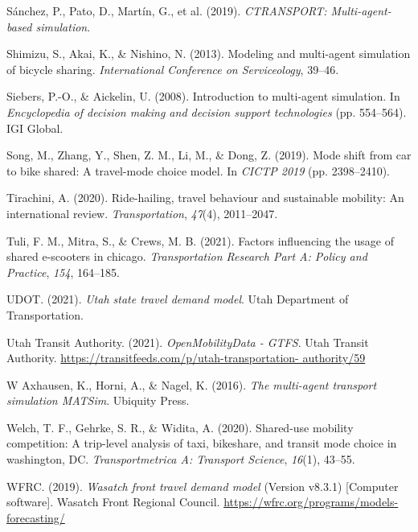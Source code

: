 \documentclass[fancy, masters]{byuthesis}
\newlength{\cslhangindent}
\newlength{\cslentryspacingunit} %
\newenvironment{CSLReferences}[2] %
 {%
  \setlength{\parindent}{0pt}
  \ifodd #1
  \let\oldpar\par
  \def\par{\hangindent=\cslhangindent\oldpar}
  \fi
  \setlength{\parskip}{#2\cslentryspacingunit}
 }%
 {}
\begin{document}
\begin{CSLReferences}{1}{0}
\leavevmode{}%
Sánchez, P., Pato, D., Martín, G., et al. (2019). \emph{CTRANSPORT: Multi-agent-based simulation}.

\leavevmode{}%
Shimizu, S., Akai, K., \& Nishino, N. (2013). Modeling and multi-agent simulation of bicycle sharing. \emph{International Conference on Serviceology}, 39--46.

\leavevmode{}%
Siebers, P.-O., \& Aickelin, U. (2008). Introduction to multi-agent simulation. In \emph{Encyclopedia of decision making and decision support technologies} (pp. 554--564). IGI Global.

\leavevmode{}%
Song, M., Zhang, Y., Shen, Z. M., Li, M., \& Dong, Z. (2019). Mode shift from car to bike shared: A travel-mode choice model. In \emph{CICTP 2019} (pp. 2398--2410).

\leavevmode{}%
Tirachini, A. (2020). Ride-hailing, travel behaviour and sustainable mobility: An international review. \emph{Transportation}, \emph{47}(4), 2011--2047.

\leavevmode{}%
Tuli, F. M., Mitra, S., \& Crews, M. B. (2021). Factors influencing the usage of shared e-scooters in chicago. \emph{Transportation Research Part A: Policy and Practice}, \emph{154}, 164--185.

\leavevmode{}%
UDOT. (2021). \emph{Utah state travel demand model}. Utah Department of Transportation.

\leavevmode{}%
Utah Transit Authority. (2021). \emph{OpenMobilityData - GTFS}. Utah Transit Authority. \href{https://transitfeeds.com/p/utah-transportation-\%20authority/59}{https://transitfeeds.com/p/utah-transportation- authority/59}

\leavevmode{}%
W Axhausen, K., Horni, A., \& Nagel, K. (2016). \emph{The multi-agent transport simulation MATSim}. Ubiquity Press.

\leavevmode{}%
Welch, T. F., Gehrke, S. R., \& Widita, A. (2020). Shared-use mobility competition: A trip-level analysis of taxi, bikeshare, and transit mode choice in washington, DC. \emph{Transportmetrica A: Transport Science}, \emph{16}(1), 43--55.

\leavevmode{}%
WFRC. (2019). \emph{Wasatch front travel demand model} (Version v8.3.1) {[}Computer software{]}. Wasatch Front Regional Council. \url{https://wfrc.org/programs/models-forecasting/}


\end{CSLReferences}
\end{document}

